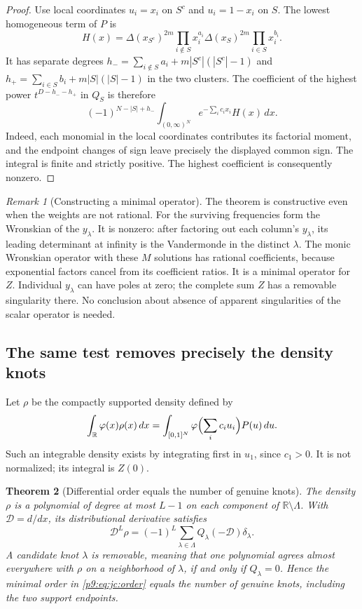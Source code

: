 \documentclass[11pt,a4paper]{article}
\newtheorem{theorem}{Theorem}[section]
\theoremstyle{definition}
\theoremstyle{remark}
\newtheorem{remark}[theorem]{Remark}
\numberwithin{equation}{section}
\begin{document}
\begin{proof}
Use local coordinates $u_i=x_i$ on $S^c$ and $u_i=1-x_i$ on $S$.
The lowest homogeneous term of $P$ is
\[
 H(x)=\Delta(x_{S^c})^{2m}\prod_{i\notin S}x_i^{a_i}
       \Delta(x_S)^{2m}\prod_{i\in S}x_i^{b_i}.
\]
It has separate degrees
$h_- =\sum_{i\notin S}a_i+m|S^c|(|S^c|-1)$ and
$h_+ =\sum_{i\in S}b_i+m|S|(|S|-1)$ in the two clusters.
The coefficient of the highest power $t^{D-h_--h_+}$ in $Q_S$
is therefore
\[
 (-1)^{N-|S|+h_-}
 \int_{(0,\infty)^N}e^{-\sum_i c_i x_i}H(x)\,dx.
\]
Indeed, each monomial in the local coordinates contributes its
factorial moment, and the endpoint changes of sign leave precisely
the displayed common sign.  The integral is finite and strictly
positive.  The highest coefficient is consequently nonzero.
\end{proof}

\begin{remark}[Constructing a minimal operator]
\label{p9:rem:jc:operator}
The theorem is constructive even when the weights are not rational.
For the surviving frequencies form the Wronskian of the
$y_\lambda$.  It is nonzero: after factoring out each column's
$y_\lambda$, its leading determinant at infinity is the Vandermonde
in the distinct $\lambda$.  The monic Wronskian operator with these
$M$ solutions has rational coefficients, because exponential factors
cancel from its coefficient ratios.  It is a minimal operator for
$Z$.  Individual $y_\lambda$ can have poles at zero; the complete sum
$Z$ has a removable singularity there.  No conclusion about absence
of apparent singularities of the scalar operator is needed.
\end{remark}

\subsection{The same test removes precisely the density knots}

Let $\rho$ be the compactly supported density defined by
\[
 \int_{\mathbb R}\varphi(x)\rho(x)\,dx
 =\int_{[0,1]^N}\varphi\Bigl(\sum_i c_i u_i\Bigr)P(u)\,du.
\]
Such an integrable density exists by integrating first in $u_1$,
since $c_1>0$.  It is not normalized; its integral is $Z(0)$.

\begin{theorem}[Differential order equals the number of genuine knots]
\label{p9:thm:jc:knots}
The density $\rho$ is a polynomial of degree at most $L-1$ on each
component of $\mathbb R\setminus\Lambda$.  With
$\mathcal D=d/dx$, its distributional derivative satisfies
\begin{equation}\label{p9:eq:jc:distribution}
 \mathcal D^L\rho
 =(-1)^L\sum_{\lambda\in\Lambda}Q_\lambda(-\mathcal D)\delta_\lambda.
\end{equation}
A candidate knot $\lambda$ is removable, meaning that one polynomial
agrees almost everywhere with $\rho$ on a neighborhood of $\lambda$,
if and only if $Q_\lambda=0$.  Hence the minimal order in
\eqref{p9:eq:jc:order} equals the number of genuine knots, including the
two support endpoints.
\end{theorem}
\end{document}
